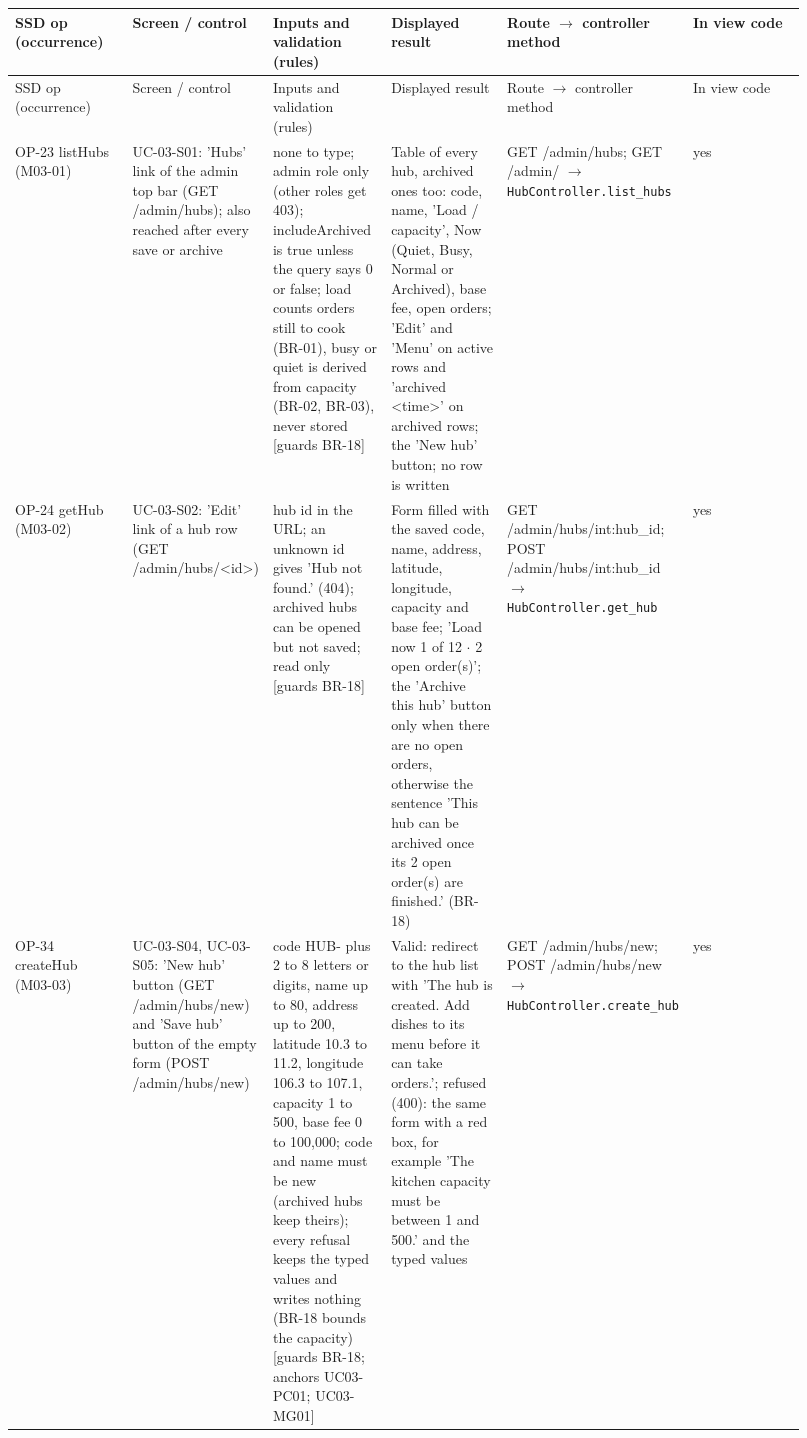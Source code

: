 \begingroup\footnotesize
\begin{longtable}{>{\raggedright\arraybackslash}p{0.1533\linewidth}>{\raggedright\arraybackslash}p{0.1533\linewidth}>{\raggedright\arraybackslash}p{0.1533\linewidth}>{\raggedright\arraybackslash}p{0.1533\linewidth}>{\raggedright\arraybackslash}p{0.1533\linewidth}>{\raggedright\arraybackslash}p{0.1533\linewidth}}
SSD op (occurrence) & Screen / control & Inputs and validation (rules) & Displayed result & Route \ensuremath{\rightarrow} controller method & In view code \\
\hline\endfirsthead
SSD op (occurrence) & Screen / control & Inputs and validation (rules) & Displayed result & Route \ensuremath{\rightarrow} controller method & In view code \\
\hline\endhead
OP-23 listHubs (M03-01) & UC-03-S01: 'Hubs' link of the admin top bar (GET /admin/hubs); also reached after every save or archive & none to type; admin role only (other roles get 403); includeArchived is true unless the query says 0 or false; load counts orders still to cook (BR-01), busy or quiet is derived from capacity (BR-02, BR-03), never stored [guards BR-18] & Table of every hub, archived ones too: code, name, 'Load / capacity', Now (Quiet, Busy, Normal or Archived), base fee, open orders; 'Edit' and 'Menu' on active rows and 'archived \textless{}time\textgreater{}' on archived rows; the 'New hub' button; no row is written & GET /admin/hubs; GET /admin/ \ensuremath{\rightarrow} \texttt{HubController.\allowbreak{}list\_\allowbreak{}hubs} & yes \\
OP-24 getHub (M03-02) & UC-03-S02: 'Edit' link of a hub row (GET /admin/hubs/\textless{}id\textgreater{}) & hub id in the URL; an unknown id gives 'Hub not found.' (404); archived hubs can be opened but not saved; read only [guards BR-18] & Form filled with the saved code, name, address, latitude, longitude, capacity and base fee; 'Load now 1 of 12 \ensuremath{\cdot} 2 open order(s)'; the 'Archive this hub' button only when there are no open orders, otherwise the sentence 'This hub can be archived once its 2 open order(s) are finished.' (BR-18) & GET /admin/hubs/int:hub\_id; POST /admin/hubs/int:hub\_id \ensuremath{\rightarrow} \texttt{HubController.\allowbreak{}get\_\allowbreak{}hub} & yes \\
OP-34 createHub (M03-03) & UC-03-S04, UC-03-S05: 'New hub' button (GET /admin/hubs/new) and 'Save hub' button of the empty form (POST /admin/hubs/new) & code HUB- plus 2 to 8 letters or digits, name up to 80, address up to 200, latitude 10.3 to 11.2, longitude 106.3 to 107.1, capacity 1 to 500, base fee 0 to 100,000; code and name must be new (archived hubs keep theirs); every refusal keeps the typed values and writes nothing (BR-18 bounds the capacity) [guards BR-18; anchors UC03-PC01; UC03-MG01] & Valid: redirect to the hub list with 'The hub is created. Add dishes to its menu before it can take orders.'; refused (400): the same form with a red box, for example 'The kitchen capacity must be between 1 and 500.' and the typed values & GET /admin/hubs/new; POST /admin/hubs/new \ensuremath{\rightarrow} \texttt{HubController.\allowbreak{}create\_\allowbreak{}hub} & yes \\

\end{longtable}
